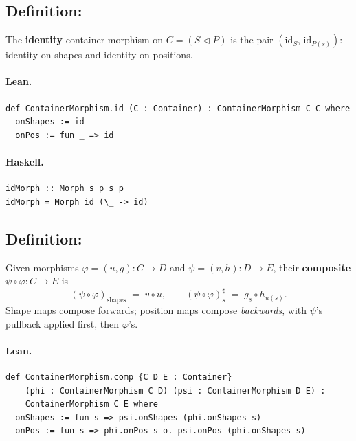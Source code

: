 \documentclass[11pt,a4paper]{article}
\begin{document}
\subsection{Definition: }

\begin{defn}
The \textbf{identity} container morphism on $C = (S \triangleleft P)$ is the
pair $(\mathrm{id}_S,\, \mathrm{id}_{P(s)})$: identity on shapes and identity
on positions.
\end{defn}

\paragraph{Lean.}
\begin{lstlisting}[style=lean]
def ContainerMorphism.id (C : Container) : ContainerMorphism C C where
  onShapes := id
  onPos := fun _ => id
\end{lstlisting}

\paragraph{Haskell.}
\begin{lstlisting}[style=haskell]
idMorph :: Morph s p s p
idMorph = Morph id (\_ -> id)
\end{lstlisting}


\subsection{Definition: }

\begin{defn}
Given morphisms $\varphi = (u, g) : C \to D$ and $\psi = (v, h) : D \to E$,
their \textbf{composite} $\psi \circ \varphi : C \to E$ is
\[
  (\psi \circ \varphi)_{\text{shapes}} \;=\; v \circ u, \qquad
  (\psi \circ \varphi)^\sharp_s \;=\; g_s \circ h_{u(s)}.
\]
Shape maps compose forwards; position maps compose \emph{backwards}, with
$\psi$'s pullback applied first, then $\varphi$'s.
\end{defn}

\paragraph{Lean.}
\begin{lstlisting}[style=lean]
def ContainerMorphism.comp {C D E : Container}
    (phi : ContainerMorphism C D) (psi : ContainerMorphism D E) :
    ContainerMorphism C E where
  onShapes := fun s => psi.onShapes (phi.onShapes s)
  onPos := fun s => phi.onPos s o. psi.onPos (phi.onShapes s)
\end{lstlisting}
\end{document}
